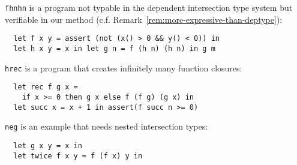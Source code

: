 \begin{asparaitem}
\item \texttt{fhnhn} is a program not typable in the dependent 
intersection type system but verifiable in our method (c.f. 
Remark~\ref{rem:more-expressive-than-deptype}):
\begin{verbatim}
  let f x y = assert (not (x() > 0 && y() < 0)) in
  let h x y = x in let g n = f (h n) (h n) in g m
\end{verbatim}
\item \texttt{hrec} is a program that creates infinitely many function 
closures:
\begin{verbatim}
  let rec f g x = 
    if x >= 0 then g x else f (f g) (g x) in
  let succ x = x + 1 in assert(f succ n >= 0)
\end{verbatim}
\item \texttt{neg} is an example that needs nested intersection types: 
\begin{verbatim}
  let g x y = x in
  let twice f x y = f (f x) y in

\end{verbatim}
\end{asparaitem}
